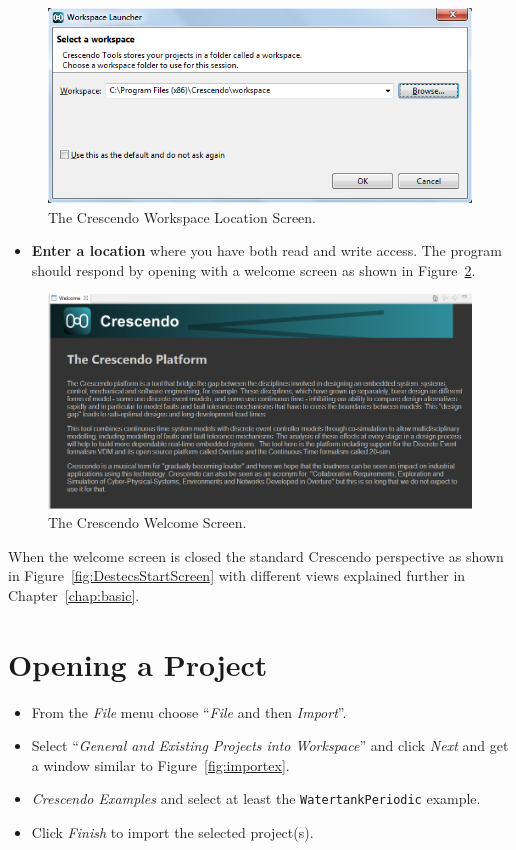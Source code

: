 \documentclass{crescendorepchap}
\begin{document}
\begin{figure}[htbp]
\centering
\includegraphics[width=.8\textwidth]{images/DestecsWorkspaceLocation.png}
\caption{The Crescendo Workspace Location Screen.\label{fig:wsloc}}
\end{figure}

\begin{itemize}
\item
  \textbf{Enter a location} where you have both read and write access.
The program should respond by opening with a welcome screen as shown in Figure~\ref{fig:welcome}.
\end{itemize}

\begin{figure}[htbp]
\centering
\includegraphics[width=.8\textwidth]{images/DestecsSplash.png}
\caption{The Crescendo Welcome Screen.\label{fig:welcome}}
\end{figure}

When the welcome screen is closed the standard Crescendo perspective as shown in Figure~\ref{fig:DestecsStartScreen} with different views explained further in Chapter~\ref{chap:basic}.

\section{Opening a Project}

\begin{itemize}
\item
  From the \emph{File} menu choose ``\emph{File} and then \emph{Import}''.
\item
  Select ``\emph{General and Existing Projects into Workspace}''
  and click \emph{Next} and get a window similar to Figure~\ref{fig:importex}.
\item
  \emph{Crescendo Examples} and select at least the
  \texttt{WatertankPeriodic} example.
\item
  Click \emph{Finish} to import the selected project(s).
\end{itemize}
\end{document}

